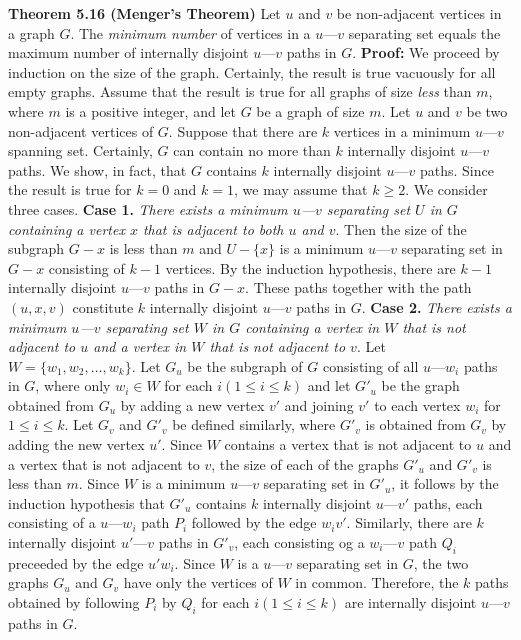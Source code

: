 \nopagenumbers
{\bf Theorem 5.16 (Menger's Theorem)}
\vskip 6pt
Let $u$ and $v$ be non-adjacent vertices in a graph $G$. The {\it minimum number} of vertices in a $u$---$v$ separating set equals the maximum number of internally disjoint $u$---$v$ paths in $G$.
\vskip 10pt
{\bf Proof:}
\vskip 6pt
We proceed by induction on the size of the graph. Certainly, the result is true vacuously for all empty graphs. Assume that the result is true for all graphs of size {\it less} than $m$, where $m$ is a positive integer, and let $G$ be a graph of size $m$. Let $u$ and $v$ be two non-adjacent vertices of $G$. Suppose that there are $k$ vertices in a minimum $u$---$v$ spanning set. Certainly, $G$ can contain no more than $k$ internally disjoint $u$---$v$ paths. We show, in fact, that $G$ contains $k$ internally disjoint $u$---$v$ paths. Since the result is true for $k=0$ and $k=1$, we may assume that $k \geq 2$. We consider three cases.
\vskip 1mm
{\bf Case 1.} {\it There exists a minimum $u$---$v$ separating set $U$ in $G$ containing a vertex $x$ that is adjacent to both $u$ and $v$}. Then the size of the subgraph $G-x$ is less than $m$ and $U - \lbrace x \rbrace$ is a minimum $u$---$v$ separating set in $G-x$ consisting of $k-1$ vertices. By the induction hypothesis, there are $k-1$ internally disjoint $u$---$v$ paths in $G-x$. These paths together with the path $(u,x,v)$ constitute $k$ internally disjoint $u$---$v$ paths in $G$.
\vskip 1mm
{\bf Case 2.} {\it There exists a minimum $u$---$v$ separating set $W$ in $G$ containing a vertex in $W$ that is not adjacent to $u$ and a vertex in $W$ that is not adjacent to $v$}. Let $W= \lbrace w_1,w_2, \ldots , w_k \rbrace$. Let $G_u$ be the subgraph of $G$ consisting of all $u$---$w_i$ paths in $G$, where only $w_i \in W$ for each $i(1 \leq i \leq k)$ and let $G'_u$ be the graph obtained from $G_u$ by adding a new vertex $v'$ and joining $v'$ to each vertex $w_i$ for $1 \leq i \leq k$. Let $G_v$ and $G'_v$ be defined similarly, where $G'_v$ is obtained from $G_v$ by adding the new vertex $u'$.
\vskip 1mm
Since $W$ contains a vertex that is not adjacent to $u$ and a vertex that is not adjacent to $v$, the size of each of the graphs $G'_u$ and $G'_v$ is less than $m$. Since $W$ is a minimum $u$---$v$ separating set in $G'_u$, it follows by the induction hypothesis that $G'_u$ contains $k$ internally disjoint $u$---$v'$ paths, each consisting of a $u$---$w_i$ path $P_i$ followed by the edge $w_iv'$. Similarly, there are $k$ internally disjoint $u'$---$v$ paths in $G'_v$, each consisting og a $w_i$---$v$ path $Q_i$ preceeded by the edge $u'w_i$. Since $W$ is a $u$---$v$ separating set in $G$, the two graphs $G_u$ and $G_v$ have only the vertices of $W$ in common. Therefore, the $k$ paths obtained by following $P_i$ by $Q_i$ for each $i(1 \leq i \leq k)$ are internally disjoint $u$---$v$ paths in $G$.
